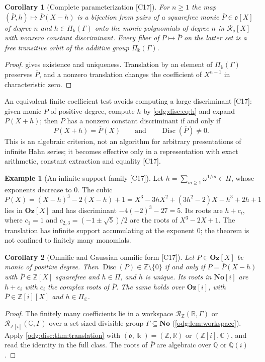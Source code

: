\documentclass[11pt,oneside]{article}
\numberwithin{equation}{section}
\newtheorem{corollary}[corollary]{Corollary}
\theoremstyle{definition}
\newtheorem{example}[example]{Example}
\theoremstyle{remark}
\newcommand{\No}{\mathbf{No}}
\newcommand{\Oz}{\mathbf{Oz}}
\newcommand{\Z}{\mathbb Z}
\newcommand{\Q}{\mathbb Q}
\newcommand{\R}{\mathbb R}
\newcommand{\C}{\mathbb C}
\newcommand{\src}[1]{\textup{\textsf{\small[#1]}}}
\newcommand{\Og}{\Oz[i]}
\newcommand{\crP}{\Pi_\Bbbk(\Gamma)}
\newcommand{\Disc}{\operatorname{Disc}}
\begin{document}
\begin{corollary}[Complete parameterization \src{C17}]\label{odg:disc:cor:param}
For $n\ge1$ the map $(\overline P,h)\mapsto\overline P(X-h)$ is a bijection from pairs of
a squarefree monic $\overline P\in\mathfrak o[X]$ of degree $n$ and $h\in\crP$ onto the
monic polynomials of degree $n$ in $\mathcal R_{\mathfrak o}[X]$ with nonzero constant
discriminant. Every fiber of $P\mapsto\overline P$ on the latter set is a free transitive
orbit of the additive group $\crP$.
\end{corollary}
\begin{proof}
 gives existence and uniqueness. Translation by an element
of $\crP$ preserves $\overline P$, and a nonzero translation changes the coefficient of
$X^{n-1}$ in characteristic zero.
\end{proof}

An equivalent finite coefficient test avoids computing a large discriminant \src{C17}:
given monic $P$ of positive degree, compute $h$ by \eqref{odg:disc:eq:h} and expand
$P(X+h)$; then $P$ has a
nonzero constant discriminant if and only if
\begin{equation}\label{odg:disc:eq:test}
 P(X+h)=\overline P(X)\qquad\text{and}\qquad \Disc(\overline P)\ne0 .
\end{equation}
This is an algebraic criterion, not an algorithm for arbitrary presentations of infinite
Hahn series; it becomes effective only in a representation with exact arithmetic,
constant extraction and equality \src{C17}.

\begin{example}[An infinite-support family \src{C17}]\label{odg:disc:ex:infinite}
Let $h=\sum_{m\ge1}\omega^{1/m}\in\Pi$, whose exponents decrease to $0$. The cubic
\[
 P(X)=(X-h)^3-2(X-h)+1=X^3-3hX^2+(3h^2-2)X-h^3+2h+1
\]
lies in $\Oz[X]$ and has discriminant $-4(-2)^3-27=5$. Its roots are $h+c_i$, where
$c_1=1$ and $c_{2,3}=(-1\pm\sqrt5)/2$ are the roots of $X^3-2X+1$. The translation has
infinite support accumulating at the exponent $0$; the theorem is not confined to
finitely many monomials.
\end{example}

\begin{corollary}[Omnific and Gaussian omnific form \src{C17}]\label{odg:disc:cor:omnific}
Let $P\in\Oz[X]$ be monic of positive degree. Then $\Disc(P)\in\Z\setminus\{0\}$ if and only if
$P=\overline P(X-h)$ with $\overline P\in\Z[X]$ squarefree and $h\in\Pi$, and $h$ is
unique. Its roots in $\No[i]$ are $h+c_i$ with $c_i$ the complex roots of $\overline P$.
The same holds over $\Og$, with $\overline P\in\Z[i][X]$ and $h\in\Pi_\C$.
\end{corollary}
\begin{proof}
The finitely many coefficients lie in a workspace $\mathcal R_\Z(\R,\Gamma)$ or
$\mathcal R_{\Z[i]}(\C,\Gamma)$ over a set-sized divisible group $\Gamma\subseteq\No$
(\cref{odg:lem:workspace}). Apply \cref{odg:disc:thm:translation} with
$(\mathfrak o,\Bbbk)=(\Z,\R)$ or $(\Z[i],\C)$, and read the identity in the full class.
The roots of $\overline P$ are algebraic over $\Q$ or $\Q(i)$.
\end{proof}
\end{document}

